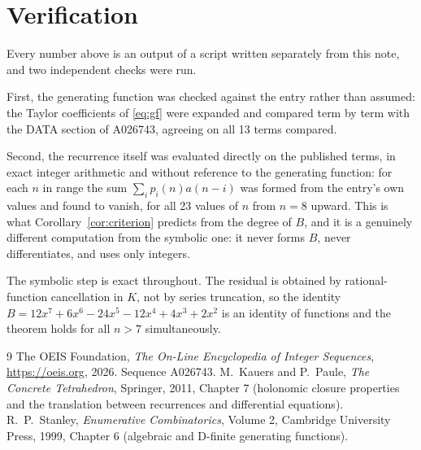 \documentclass[11pt,a4paper]{article}
\theoremstyle{plain}
\theoremstyle{definition}
\begin{document}
\section{Verification}

Every number above is an output of a script written separately from this note, and two
independent checks were run.

First, the generating function was checked against the entry rather than assumed: the
Taylor coefficients of \eqref{eq:gf} were expanded and compared term by term with the DATA
section of A026743, agreeing on all 13 terms compared.

Second, the recurrence itself was evaluated directly on the published terms, in exact
integer arithmetic and without reference to the generating function: for each $n$ in range
the sum $\sum_{i}p_{i}(n)a(n-i)$ was formed from the entry's own values and found to
vanish, for all 23 values of $n$ from $n=8$ upward. This is what
Corollary~\ref{cor:criterion} predicts from the degree of $B$, and it is a genuinely
different computation from the symbolic one: it never forms $B$, never differentiates, and
uses only integers.

The symbolic step is exact throughout. The residual is obtained by rational-function
cancellation in $K$, not by series truncation, so the identity $B=12 x^{7} + 6 x^{6} - 24 x^{5} - 12 x^{4} + 4 x^{3} + 2 x^{2}$ is an
identity of functions and the theorem holds for all $n>7$ simultaneously.

\begin{thebibliography}{9}
 The OEIS Foundation, \emph{The On-Line Encyclopedia of Integer Sequences},
\url{https://oeis.org}, 2026. Sequence A026743.
 M.~Kauers and P.~Paule, \emph{The Concrete Tetrahedron}, Springer, 2011,
Chapter 7 (holonomic closure properties and the translation between recurrences and
differential equations).
 R.~P.~Stanley, \emph{Enumerative Combinatorics}, Volume 2, Cambridge
University Press, 1999, Chapter 6 (algebraic and D-finite generating functions).
\end{thebibliography}
\end{document}
